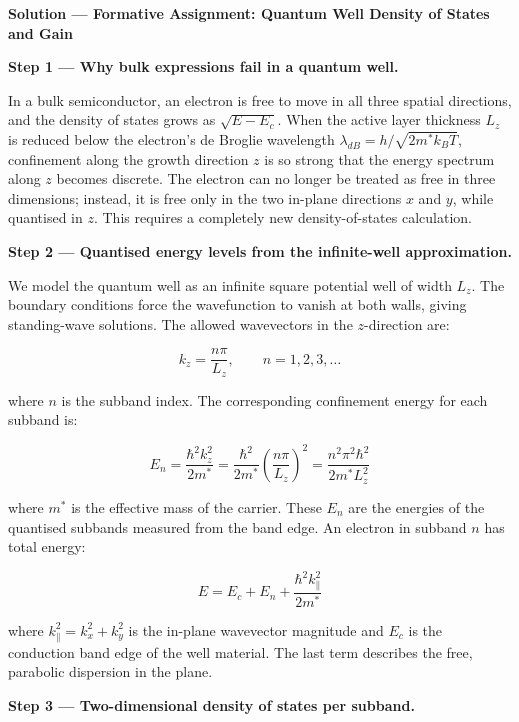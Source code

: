 \textbf{\large Solution --- Formative Assignment: Quantum Well Density of States and Gain}

\textbf{Step 1 — Why bulk expressions fail in a quantum well.}

In a bulk semiconductor, an electron is free to move in all three spatial directions, and the density of states grows as $\sqrt{E - E_c}$. When the active layer thickness $L_z$ is reduced below the electron's de Broglie wavelength $\lambda_{dB} = h/\sqrt{2m^*k_BT}$, confinement along the growth direction $z$ is so strong that the energy spectrum along $z$ becomes discrete. The electron can no longer be treated as free in three dimensions; instead, it is free only in the two in-plane directions $x$ and $y$, while quantised in $z$. This requires a completely new density-of-states calculation.

\textbf{Step 2 — Quantised energy levels from the infinite-well approximation.}

We model the quantum well as an infinite square potential well of width $L_z$. The boundary conditions force the wavefunction to vanish at both walls, giving standing-wave solutions. The allowed wavevectors in the $z$-direction are:

\begin{equation*}
  k_z = \frac{n\pi}{L_z}, \qquad n = 1, 2, 3, \ldots
\end{equation*}

where $n$ is the subband index. The corresponding confinement energy for each subband is:

\begin{equation*}
  E_n = \frac{\hbar^2 k_z^2}{2m^*} = \frac{\hbar^2}{2m^*}\left(\frac{n\pi}{L_z}\right)^2 = \frac{n^2\pi^2\hbar^2}{2m^* L_z^2}
\end{equation*}

where $m^*$ is the effective mass of the carrier. These $E_n$ are the energies of the quantised subbands measured from the band edge. An electron in subband $n$ has total energy:

\begin{equation*}
  E = E_c + E_n + \frac{\hbar^2 k_\parallel^2}{2m^*}
\end{equation*}

where $k_\parallel^2 = k_x^2 + k_y^2$ is the in-plane wavevector magnitude and $E_c$ is the conduction band edge of the well material. The last term describes the free, parabolic dispersion in the plane.

\textbf{Step 3 — Two-dimensional density of states per subband.}


